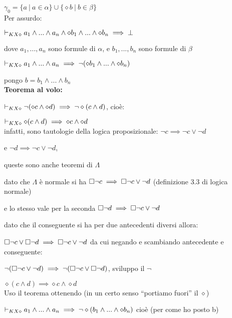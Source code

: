 $\gamma_{0}=\{a\ |\ a\in\alpha\}\cup\{\diamond b\ |\ b\in\beta\}$\\


Per assurdo:

$\vdash_{KX\diamond}a_{1}\wedge...\wedge a_{n}\wedge\diamond b_{1}\wedge...\wedge\diamond b_{n}\implies\bot$

dove $a_{1},...,a_{n}$ sono formule di $\alpha$, e $b_{1},...,b_{n}$
sono formule di $\beta$

$\vdash_{KX\diamond}a_{1}\wedge...\wedge a_{n}\implies\neg(\diamond b_{1}\wedge...\wedge\diamond b_{n})$

pongo $b=b_{1}\wedge...\wedge b_{n}$\\


\textbf{Teorema al volo:}

$\vdash_{KX\diamond}\neg(\diamond c\wedge\diamond d)\implies\neg\diamond(c\wedge d)$,
cioè:

\textbf{$\vdash_{KX\diamond}\diamond(c\wedge d)\implies\diamond c\wedge\diamond d$}\\
 infatti, sono tautologie della logica proposizionale: $\neg c\implies\neg c\vee\neg d$

e $\neg d\implies\neg c\vee\neg d$,

queste sono anche teoremi di $\Lambda$

dato che $\Lambda$ è normale si ha \foreignlanguage{english}{$\square\neg c\implies\square\neg c\vee\neg d$}
(definizione 3.3 di logica normale)

e lo stesso vale per la seconda $\square\neg d\implies\square\neg c\vee\neg d$

dato che il conseguente si ha per due antecedenti diversi allora:

%
$\square\neg c\vee\square\neg d\implies\square\neg c\vee\neg d$\foreignlanguage{italian}{
da cui negando e scambiando antecedente e conseguente:}

%
$\neg(\square\neg c\vee\neg d)\implies\neg(\square\neg c\vee\square\neg d)$,
sviluppo il $\neg$

$\diamond(c\wedge d)\implies\diamond c\wedge\diamond d$\\


Uso il teorema ottenendo (in un certo senso ``portiamo fuori'' il
$\diamond$)

%
$\vdash_{KX\diamond}a_{1}\wedge...\wedge a_{n}\implies\neg\diamond(b_{1}\wedge...\wedge\diamond b_{n})$\foreignlanguage{italian}{
cioè (per come ho posto b)}

